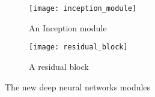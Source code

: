 \documentclass[../main.tex]{subfiles}
\begin{document}
\begin{figure}[!ht]
   \centering
    \begin{subfigure}{0.4\linewidth}
        \texttt{[image: inception\_module]}
        \caption{An Inception module} \cite{Szegedy2015}
    \end{subfigure}
    \begin{subfigure}{0.4\linewidth}
        \texttt{[image: residual\_block]}
        \caption{A residual block} \cite{Wu2017}
    \end{subfigure}
   
  \caption{The new deep neural networks modules}
  \label{fig:blocks}
\end{figure}






   
\end{document}
